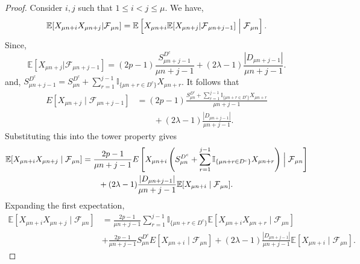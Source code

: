 \documentclass[10pt,a4paper]{amsart}
\newcommand{\E}{\mbox{${\mathbb E}$}}
\newcommand{\FF}{\mbox{${\mathcal F}$}}
\newcommand{\I}{\mbox{${\mathbb I}$}}
\begin{document}
\begin{proof}
    Consider $i, j$ such that $1 \leq i < j \leq \mu$. We have,
    \[ \E[X_{\mu n+i}X_{\mu n+j}\vert \FF_{\mu n}] = \E \left[ X_{\mu n+i} \E[X_{\mu n+j}\vert  \FF_{\mu n + j-1} ] \Bigm| \FF_{\mu n} \right]. \]
    Since, \[\E[X_{\mu n+j}\vert \FF_{\mu n + j-1}] = (2p-1) \frac{S_{\mu n+j-1}^{D^c}}{\mu n+j-1} + (2\lambda-1) \frac{|D_{\mu n+j-1}|}{\mu n+j-1}.\]
    and, $S_{\mu n+j-1}^{D^c} = S_{\mu n}^{D^c} + \sum_{r=1}^{j-1} \I_{\{\mu n+r\in D^c\}} X_{\mu n+r}$. 
It follows that
\begin{align*}
E[X_{\mu n+j}\mid  \FF_{\mu n + j-1} ]
&=
(2p-1)
\frac{
S_{\mu n}^{D^c}
+
\sum_{r=1}^{j-1}
\I_{\{\mu n+r\in D^c\}}
X_{\mu n+r}
}
{\mu n+j-1}
\\
&\qquad
+
(2\lambda-1)
\frac{|D_{\mu n+j-1}|}{\mu n+j-1}.
\end{align*}
Substituting this into the tower property gives
\begin{align*}
\E[X_{\mu n+i}X_{\mu n+j}\mid \FF_{\mu n}]
&=
\frac{2p-1}{\mu n+j-1}
E\left[
X_{\mu n+i}
\left(
S_{\mu n}^{D^c}
+
\sum_{r=1}^{j-1}
\I_{\{\mu n+r\in D^c\}}
X_{\mu n+r}
\right)
\Bigm|
\FF_{\mu n}
\right]
\\
&\qquad
+
(2\lambda-1)
\frac{|D_{\mu n+j-1}|}{\mu n+j-1}
\E[X_{\mu n+i}\mid \FF_{\mu n}].
\end{align*}
Expanding the first expectation,
\begin{align*}
\E[X_{\mu n+i}X_{\mu n+j}\mid \FF_{\mu n}]
&= \frac{2p-1}{\mu n+j-1}
\sum_{r=1}^{j-1}
\I_{\{\mu n+r\in D^c\}}
\E[X_{\mu n+i}X_{\mu n+r}\mid \FF_{\mu n}]
\\
& + \frac{2p-1}{\mu n+j-1}
S_{\mu n}^{D^c}
E[X_{\mu n+i}\mid \FF_{\mu n}] +
(2\lambda-1)
\frac{|D_{\mu n+j-1}|}{\mu n+j-1}
\E[X_{\mu n+i}\mid \FF_{\mu n}].
\end{align*}


\end{proof}
\end{document}
